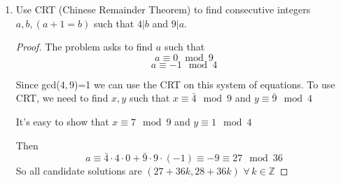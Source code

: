 \documentclass[12pt]{article}
\theoremstyle{definition}
\begin{document}
\begin{enumerate}
\begin{proof}[Proof $\#2$]
$$2^3=8\equiv 1 \mod 7 \Rightarrow 2^{100}=2\cdot (2^3)^{33} \equiv 2\cdot 1^{33} \equiv 2 \mod 7$$
$$4^3=64\equiv 1 \mod 7 \Rightarrow 4^{100}=4\cdot (4^3)^{33} \equiv 4\cdot 1^{33} \equiv 4 \mod 7$$
$$3^3=27\equiv -1 \mod 7 \Rightarrow 3^{100}=3\cdot (3^3)^{33} \equiv 3\cdot (-1)^{33} \equiv -3 \mod 7$$
$$5^3=125\equiv -1 \mod 7 \Rightarrow 5^{100}=5\cdot (5^3)^{33} \equiv 5\cdot (-1)^{33} \equiv -5 \mod 7$$
Hence by the addition rule:
$$2^{100}+3^{100}+4^{100}+5^{100}\equiv 2+3-3-5=\equiv-2\equiv 5 \mod 7$$ 
\end{proof}

\item Use CRT (Chinese Remainder Theorem) to find consecutive integers
  $a,b, (a+1=b)$ such that $4|b$ and $9|a$.

\begin{proof}
The problem asks to find $a$ such that
$$a\equiv 0 \mod 9$$
$$a \equiv -1 \mod 4$$

Since gcd($4,9$)=1 we can use the CRT on this system of equations. To use CRT, we need to find $x,y$ such that $x\equiv \bar{4} \mod 9$ and $y\equiv \bar{9} \mod 4$

It's easy to show that $x\equiv 7 \mod 9$ and $y\equiv 1 \mod 4$

Then $$a\equiv \bar{4}\cdot4\cdot0+\bar{9}\cdot9\cdot(-1) \equiv -9
\equiv 27 \mod 36$$ So all candidate solutions are $(27+36k,28+36k)$
$\forall\,k\in\mathbb{Z}$
\end{proof}
\end{enumerate}
\end{document}
